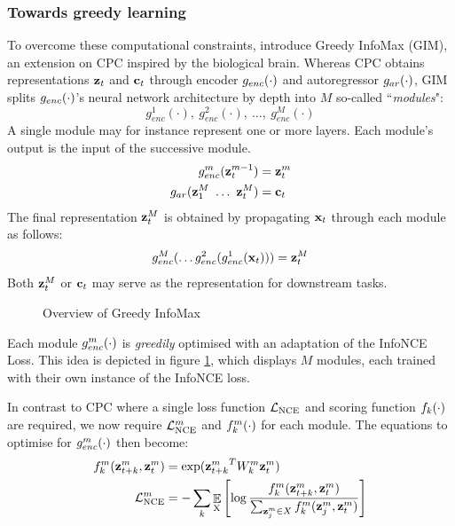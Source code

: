 \subsubsection{Towards greedy learning}	
		To overcome these computational constraints, \cite{lowePuttingEndEndtoEnd2020a} introduce Greedy InfoMax (GIM), an extension on CPC inspired by the biological brain. Whereas CPC obtains representations $\mathbf{z}_t$ and $\mathbf{c}_t$ through encoder $g_{enc}(\cdot)$ and autoregressor $g_{ar}(\cdot)$, GIM splits $g_{enc}(\cdot)$'s neural network architecture by depth into $M$ so-called ``\textit{modules}": 
		$$g_{enc}^1(\cdot),~ g_{enc}^2(\cdot),~\dots,~g_{enc}^M(\cdot)$$ 
		A single module may for instance represent one or more layers. Each module's output is the input of the successive module.
		\begin{align*} %
			g_{enc}^m(\zt^{m-1}) &= \zt^m \\
			g_{ar}(\z_1^M ~ \dots ~ \zt^M) &= \ct
		\end{align*}
		The final representation $\mathbf{z}_t^M$ is obtained by propagating $\mathbf{x}_t$ through each module as follows:
		$$ g_{enc}^M ( \dots	g_{enc}^2(g_{enc}^1(\mathbf{x}_t))) = \mathbf{z}_t^M $$
		Both $\mathbf{z}_t^M$ or $\mathbf{c}_t$ may serve as the representation for downstream tasks.
	
	\begin{figure}[h!t]
		\hspace{2cm}
		
		\caption{Overview of Greedy InfoMax}
		\label{fig:gim-overview}
	\end{figure}


	
		Each module $g_{enc}^m(\cdot)$ is \textit{greedily} optimised with an adaptation of the InfoNCE Loss. This idea is depicted in figure \ref{fig:gim-overview}, which displays $M$ modules, each trained with their own instance of the InfoNCE loss.
		
		In contrast to CPC where a single loss function $\mathcal{L}_{\text{NCE}}$ and scoring function $f_k(\cdot)$ are required, we now require $\mathcal{L}_{\text{NCE}}^m$ and $f_k^m(\cdot)$ for each module. The equations to optimise for $g_{enc}^m(\cdot)$ then become:
		\begin{align}
			f_k^m(\mathbf{z}_{t+k}^m,\mathbf{z}_t^m) &= \exp({\mathbf{z}_{t+k}^m}^TW_k^m\mathbf{z}_t^m) \label{eq:fkm} \\
			\mathcal{L}_{\text{NCE}}^m &= -\sum_{k} \mathop{\mathbb{E}}_{\substack{\textsubscript{X}}} \left[\log \frac{f_k^m({\mathbf{z}_{t+k}^m},{\mathbf{z}_t^m}) }{\sum_{\mathbf{z}_j^m \in X} f_k^m(\mathbf{z}_j^m, \mathbf{z}_t^m)} \right]	
		\end{align}
	
